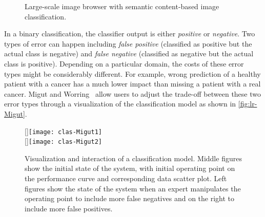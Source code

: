 \begin{figure}[!htb]
\centering
{} 
\hfill
{} 
\label{fig:lr-SIB}
\caption{Large-scale image browser with semantic content-based image classification. }
\end{figure}

In a binary classification, the classifier output is either \emph{positive} or \emph{negative}. Two types of error can happen including \emph{false positive} (classified as positive but the actual class is negative) and \emph{false negative} (classified as negative but the actual class is positive). Depending on a particular domain, the costs of these error types might be considerably different. For example, wrong prediction of a healthy patient with a cancer has a much lower impact than missing a patient with a real cancer. Migut and Worring~\cite{Migut2010} allow users to adjust the trade-off between these two error types through a visualization of the classification model as shown in \autoref{fig:lr-Migut}.

\begin{figure}[!htb]
\centering
{}[\columnwidth]{\texttt{[image: clas-Migut1]}} 
\\
[\columnwidth]{\texttt{[image: clas-Migut2]}}
\caption{Visualization and interaction of a classification model. Middle figures show the initial state of the system, with initial operating point on the performance curve and corresponding data scatter plot. Left figures show the state of the system when an expert manipulates the operating point to include more false negatives and on the right to include more false positives. }
\label{fig:lr-Migut}
\end{figure}

